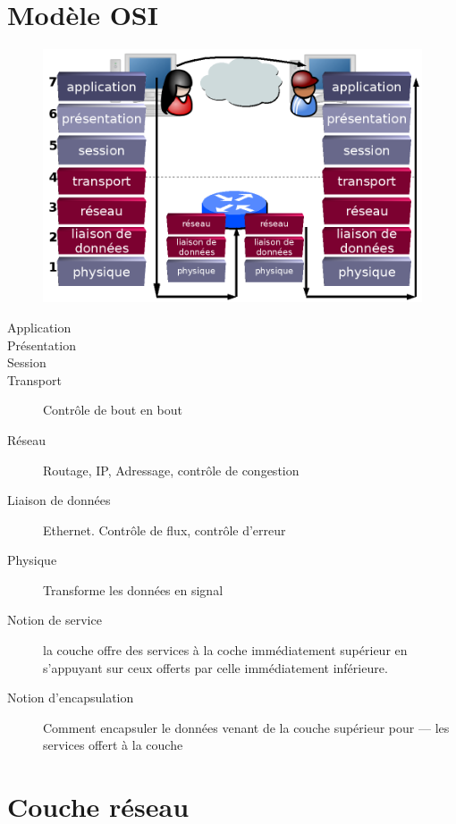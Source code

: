 	\chapter{Modèle OSI}
	\begin{figure}[H]
		\centering
		\includegraphics[width=13cm]{osi-model.png}
	\end{figure}
	\begin{description}
		\item[Application]
		\item[Présentation]
		\item[Session]
		\item[Transport] Contrôle de bout en bout
		\item[Réseau] Routage, IP, Adressage, contrôle de congestion
		\item[Liaison de données] Ethernet. Contrôle de flux, contrôle d'erreur
		\item[Physique] Transforme les données en signal
	\end{description}
	\begin{description}
		\item[Notion de service] la couche offre des services à la coche immédiatement supérieur en s'appuyant sur ceux offerts par celle immédiatement inférieure.
		\item[Notion d'encapsulation] Comment encapsuler le données venant de la couche supérieur pour --- les services offert à la couche
	\end{description}

	\chapter{Couche réseau}
